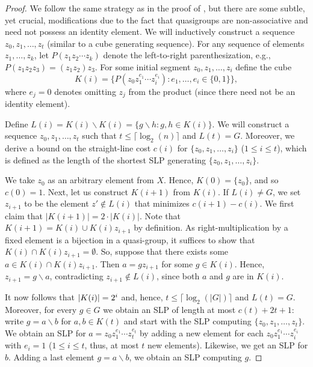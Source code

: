 \documentclass{article}
\newcommand{\abs}[1]{\left|\mathinner{#1}\right|}
\begin{document}
\begin{proof}
We follow the same strategy as in the proof of \cite[Theorem~3.1]{BabaiSzemeredi}, but there are some subtle, yet crucial, modifications due to the fact that quasigroups are non-associative and need not possess an identity element. We will inductively construct a sequence $z_0,z_{1}, \ldots, z_{t}$ (similar to a cube generating sequence). For any sequence of elements $z_1,\dotsc,z_k$, let $P(z_1 z_2 \dotsb z_k)$ denote the left-to-right parenthesization, e.g., $P(z_1 z_2 z_3) = (z_1 z_2) z_3$. For some initial segment $z_0, z_{1}, \ldots, z_{i}$ define the cube
\[
K(i) = \{ P(z_0z_{1}^{e_{1}} \cdots z_{i}^{e_{i}}) : e_{1}, \ldots, e_{i} \in \{0,1\}\},
\]
where $e_j=0$ denotes omitting $z_j$ from the product (since there need not be an identity element).


 Define $L(i) = K(i)\backslash K(i) = \{ g\backslash h : g,h \in K(i)\}$.
We will construct a sequence $z_0,z_{1}, \ldots, z_{t}$ such that $t \leq \lceil \log_{2}(n) \rceil$ and $L(t) = G$. Moreover, we derive a bound on the straight-line cost $c(i)$ for $\{z_0,z_{1}, \ldots, z_{i}\}$ ($1\leq i \leq t$), which is defined as the length of the shortest SLP generating $\{z_0,z_{1}, \ldots, z_{i}\}$. 

We take $z_0$ as an arbitrary element from $X$. Hence,  $K(0) = \{z_0\}$, and so $c(0) = 1$. 
Next, let us construct $K(i+1)$ from $K(i)$. If $L(i) \neq G$, we set $z_{i+1}$ to be the element $z' \notin L(i)$ that minimizes $c(i+1)-c(i)$. 
We first claim that $|K(i+1)| = 2 \cdot |K(i)|$.
Note that $K(i+1)= K(i) \cup K(i)z_{i+1}$ by definition.
As right-multiplication by a fixed element is a bijection in a quasi-group, it suffices to show that $K(i) \cap K(i)z_{i+1} = \emptyset$.
So, suppose that there exists some $a \in K(i) \cap K(i)z_{i+1}$. Then $a = gz_{i+1}$ for some $g \in K(i)$. Hence, $z_{i+1} = g\backslash a$, contradicting $z_{i+1} \not\in L(i)$, since both $a$ and $g$ are in $K(i)$. 

It now follows that $\abs{K(i)} = 2^i$ and, hence, $t \leq \lceil \log_{2}(|G|) \rceil$ and $L(t) = G$. 
Moreover, for every $g \in G$ we obtain an SLP of length at most $c(t) + 2t + 1$: write $g = a\backslash b$ for $a,b \in K(t)$ and start with the SLP computing $\{z_0,z_{1}, \ldots, z_{t}\}$. We obtain an SLP for $a = z_0z_{1}^{e_{1}} \cdots z_{t}^{e_{t}}$ by adding a new element for each $z_0z_{1}^{e_{1}} \cdots z_{i}^{e_{i}}$ with $e_i = 1$ ($1\leq i \leq t$, thus, at most $t$ new elements). Likewise, we get an SLP for $b$. Adding a last element $g=a\backslash b$, we obtain an SLP computing $g$.




\end{proof}
\end{document}
